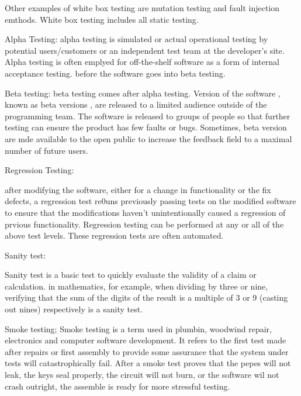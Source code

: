 Other examples of white box testing are mutation testing and fault injection emthods. 
White box testing includes all static testing. 


Alpha Testing: alpha testing is simulated or actual operational testing by potential users/customers or an independent test team at the developer's site. 
Alpha testing is often emplyed for off-the-shelf software as a form of internal acceptance testing. before the software goes into beta testing. 

Beta testing: 
beta testing comes after alpha testing. Version of the software , known as beta versions , are released to a limited audience outside of the programming team. The software is 
released to groups of people so that further testing can ensure the product has few faults or bugs. Sometimes, beta version are mde available to the open public to increase the feedback field to a maximal number of future users. 

Regression Testing:

after modifying the software, either for a change in functionality or the fix defects, a regression test re0uns previously passing tests on the modified 
software to ensure that the modifications haven't unintentionally caused a regression of prvious functionality. Regression testing can be performed at any or all of the 
above test levels. These regression tests are often automated. 

Sanity test: 

Sanity test is a basic test to quickly evaluate the validity of a claim or calculation. in mathematics, for example, when dividing by three or nine, verifying that the sum of the digits of the result is 
a multiple of 3 or 9 (casting out nines) respectively is a sanity test. 

Smoke testing; 
Smoke testing is a term used in plumbin, woodwind repair, electronics and computer software development. It refers to the first test made after repairs or first assembly to 
provide some assurance that the system under tests will catastrophically fail. After a smoke test proves that the pepes will not leak, the keys seal properly, the circuit will 
not burn, or the software wil not crash outright, the assemble is ready for more stressful testing. 


